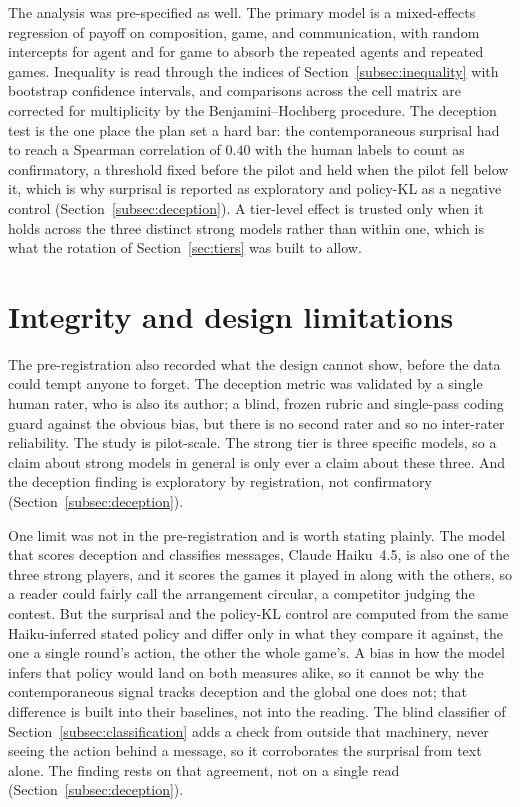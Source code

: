 The analysis was pre-specified as well. The primary model is a mixed-effects
regression of payoff on composition, game, and communication, with random
intercepts for agent and for game to absorb the repeated agents and repeated
games. Inequality is read through the indices of
Section~\ref{subsec:inequality} with bootstrap confidence intervals, and
comparisons across the cell matrix are corrected for multiplicity by the
Benjamini--Hochberg procedure. The deception test is the one place the plan set a
hard bar: the contemporaneous surprisal had to reach a Spearman correlation of
$0.40$ with the human labels to count as confirmatory, a threshold fixed before
the pilot and held when the pilot fell below it, which is why surprisal is
reported as exploratory and policy-KL as a negative control
(Section~\ref{subsec:deception}). A tier-level
effect is trusted only when it holds across the three distinct strong models
rather than within one, which is what the rotation of Section~\ref{sec:tiers} was
built to allow.

\section{Integrity and design limitations}
\label{sec:integrity}

The pre-registration also recorded what the design cannot show, before the data
could tempt anyone to forget. The deception metric was validated by a single human
rater, who is also its author; a blind, frozen rubric and single-pass coding guard
against the obvious bias, but there is no second rater and so no inter-rater
reliability. The study is pilot-scale. The strong tier is three specific models,
so a claim about strong models in general is only ever a claim about these three.
And the deception finding is exploratory by registration, not confirmatory
(Section~\ref{subsec:deception}).

One limit was not in the pre-registration and is worth stating plainly. The model
that scores deception and classifies messages, Claude Haiku~4.5, is also one of
the three strong players, and it scores the games it played in along with the
others, so a reader could fairly call the arrangement circular, a competitor
judging the contest. But the surprisal and the policy-KL control are computed from
the same Haiku-inferred stated policy and differ only in what they compare it
against, the one a single round's action, the other the whole game's. A bias in
how the model infers that policy would land on both measures alike, so it cannot
be why the contemporaneous signal tracks deception and the global one does not;
that difference is built into their baselines, not into the reading. The blind
classifier of Section~\ref{subsec:classification} adds a check from outside that
machinery, never seeing the action behind a message, so it corroborates the
surprisal from text alone. The finding rests on that agreement, not on a single
read (Section~\ref{subsec:deception}).

